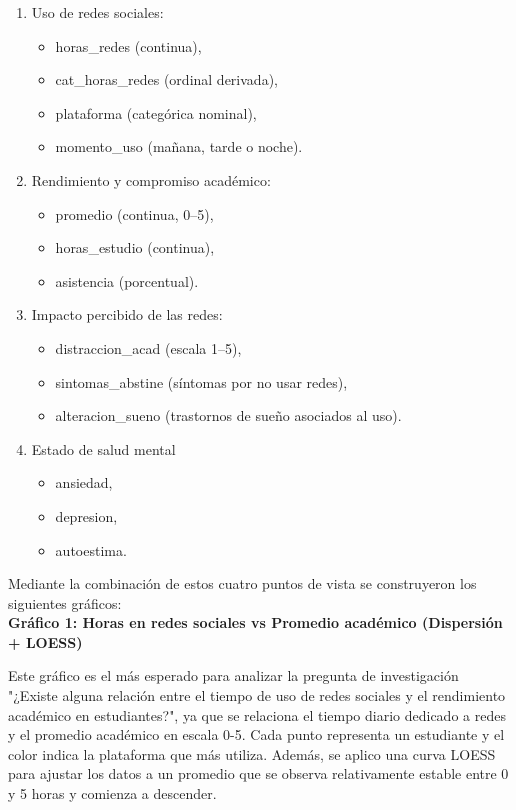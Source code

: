 \documentclass[12pt]{article}
\begin{document}
\begin{enumerate}
    \item Uso de redes sociales:
    \begin{itemize}
        \item horas\_redes (continua), \item cat\_horas\_redes (ordinal derivada), \item plataforma (categórica nominal), \item momento\_uso (mañana, tarde o noche).
    \end{itemize}
    \item Rendimiento y compromiso académico:
    \begin{itemize}
        \item promedio (continua, 0–5), 
        \item horas\_estudio (continua), 
        \item asistencia (porcentual).
    \end{itemize}
    \item Impacto percibido de las redes:
    \begin{itemize}
        \item distraccion\_acad (escala 1–5), 
        \item sintomas\_abstine (síntomas por no usar redes), 
        \item alteracion\_sueno (trastornos de sueño asociados al uso).
    \end{itemize}
    \item Estado de salud mental
    \begin{itemize}
        \item ansiedad,
        \item depresion,
        \item autoestima.
    \end{itemize}
\end{enumerate}

Mediante la combinación de estos cuatro puntos de vista se construyeron los siguientes gráficos:
\\

\textbf{Gráfico 1: Horas en redes sociales vs Promedio académico (Dispersión + LOESS)}

Este gráfico es el más esperado para analizar la pregunta de investigación "¿Existe alguna relación entre el tiempo de uso de redes sociales y el rendimiento                   académico en estudiantes?", ya que se relaciona el tiempo diario dedicado a redes y el promedio académico en escala 0-5. Cada punto representa un estudiante y el color indica la plataforma que más utiliza. Además, se aplico una curva LOESS para ajustar los datos a un promedio que se observa relativamente estable entre 0 y 5 horas y comienza a descender. 
\end{document}
